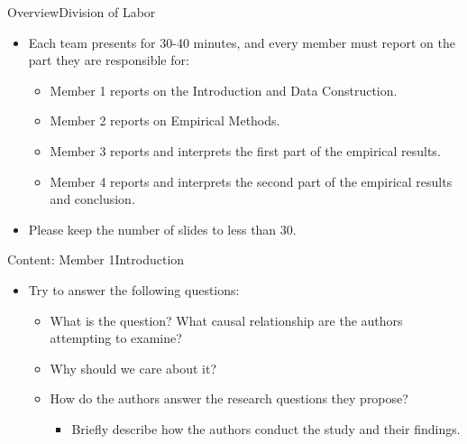 \documentclass[hyperref={pdfpagelabels=false}]{beamer}
\begin{document}
\begin{frame}{Overview}{Division of Labor}
	\begin{itemize}
		\item Each team presents for 30-40 minutes, and every member must report on the part they are responsible for:
															\vspace{0.2cm}
		\begin{itemize}
			\item Member 1 reports on the Introduction and Data Construction.
																\vspace{0.2cm}
			\item Member 2 reports on Empirical Methods.
																\vspace{0.2cm}
			\item Member 3 reports and interprets the first part of the empirical results.
																\vspace{0.2cm}
			\item Member 4 reports and interprets the second part of the empirical results and conclusion.
																\vspace{0.2cm}
		\end{itemize}
		\item Please keep the number of slides to less than 30.
	\end{itemize}
\end{frame}

\begin{frame}{Content: Member 1}{Introduction}
	\begin{itemize}
		\item Try to answer the following questions:
															\vspace{0.2cm}
		\begin{itemize}
			\item What is the question? What causal relationship are the authors attempting to examine?
																\vspace{0.2cm}
			\item Why should we care about it?
																\vspace{0.2cm}
			\item How do the authors answer the research questions they propose?
			\begin{itemize}
																	\vspace{0.2cm}
				\item Briefly describe how the authors conduct the study and their findings.
			\end{itemize}
		\end{itemize}
	\end{itemize}
\end{frame}
\end{document}
